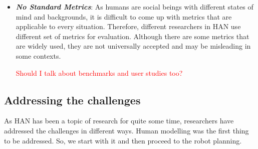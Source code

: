 \begin{itemize}[leftmargin=*]
    \item \textbf{\textit{No Standard Metrics}}: As humans are social beings with different states of mind and backgrounds, it is difficult to come up with metrics that are applicable to every situation. Therefore, different researchers in HAN use different set of metrics for evaluation. Although there are some metrics that are widely used, they are not universally accepted and may be misleading in some contexts.
    
    \textcolor{red}{Should I talk about benchmarks and user studies too?}
\end{itemize}

\subsection{Addressing the challenges}
As HAN has been a topic of research for quite some time, researchers have addressed the challenges in different ways. Human modelling was the first thing to be addressed. So, we start with it and then proceed to the robot planning.
